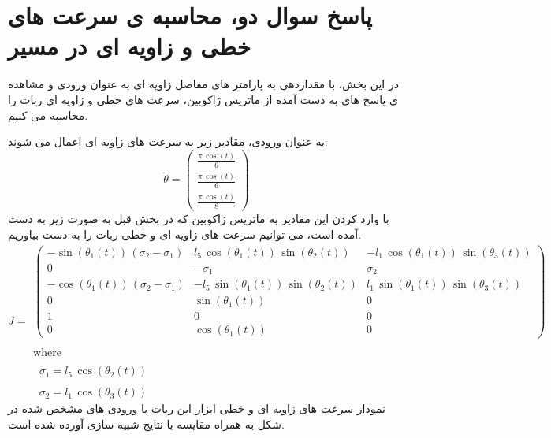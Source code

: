 \section*{پاسخ سوال دو، محاسبه ی سرعت های خطی و زاویه ای در مسیر}
در این بخش، با مقداردهی به پارامتر های مفاصل زاویه ای به عنوان ورودی و مشاهده ی پاسخ های به دست آمده از ماتریس ژاکوبین، سرعت های خطی و زاویه ای ربات را محاسبه می کنیم.

به عنوان ورودی، مقادیر زیر به سرعت های زاویه ای اعمال می شوند:
\[
\dot{\theta} = 
\begin{pmatrix}
	\frac{\pi \,\cos \left(t\right)}{6} \\
	\frac{\pi \,\cos \left(t\right)}{6} \\
	\frac{\pi \,\cos \left(t\right)}{8}
\end{pmatrix}
\]
با وارد کردن این مقادیر به ماتریس ژاکوبین که در بخش قبل به صورت زیر به دست آمده است، می توانیم سرعت های زاویه ای و خطی ربات را به دست بیاوریم.
\[
J = 
\begin{array}{l}
	\begin{pmatrix}
		-\sin \left(\theta_1 \left(t\right)\right)\,{\left(\sigma_2 -\sigma_1 \right)} & l_5 \,\cos \left(\theta_1 \left(t\right)\right)\,\sin \left(\theta_2 \left(t\right)\right) & -l_1 \,\cos \left(\theta_1 \left(t\right)\right)\,\sin \left(\theta_3 \left(t\right)\right) \\
		0 & -\sigma_1 & \sigma_2 \\
		-\cos \left(\theta_1 \left(t\right)\right)\,{\left(\sigma_2 -\sigma_1 \right)} & -l_5 \,\sin \left(\theta_1 \left(t\right)\right)\,\sin \left(\theta_2 \left(t\right)\right) & l_1 \,\sin \left(\theta_1 \left(t\right)\right)\,\sin \left(\theta_3 \left(t\right)\right) \\
		0 & \sin \left(\theta_1 \left(t\right)\right) & 0 \\
		1 & 0 & 0 \\
		0 & \cos \left(\theta_1 \left(t\right)\right) & 0
	\end{pmatrix} \\
	\\
	\text{where} \\
	\\
	\;\;\sigma_1 = l_5 \,\cos \left(\theta_2 \left(t\right)\right) \\
	\\
	\;\;\sigma_2 = l_1 \,\cos \left(\theta_3 \left(t\right)\right)
\end{array}
\]
نمودار سرعت های زاویه ای و خطی ابزار این ربات با ورودی های مشخص شده در شکل به همراه مقایسه با نتایج شبیه سازی آورده شده است.
